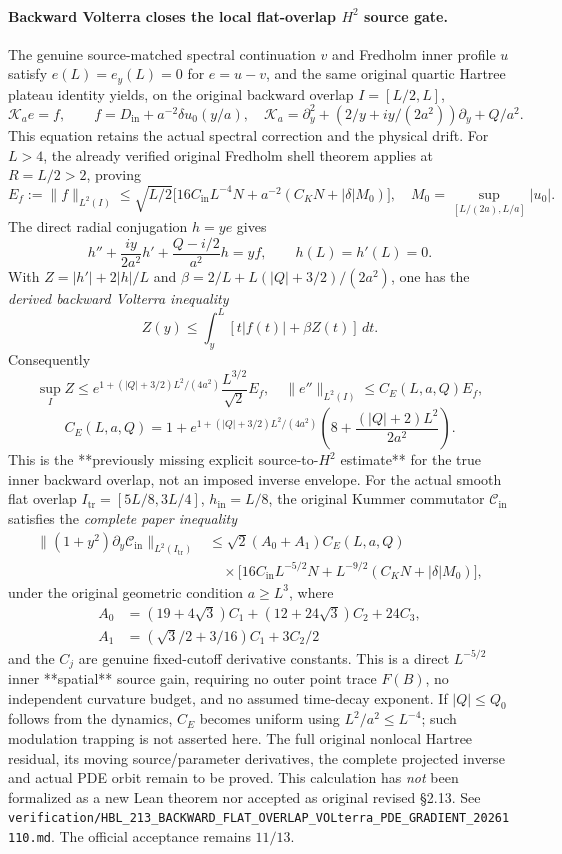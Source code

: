 \documentclass[11pt]{amsart}
\begin{document}
\paragraph{Backward Volterra closes the local flat-overlap \(H^2\) source gate.}
The genuine source-matched spectral continuation \(v\)
and Fredholm inner profile \(u\) satisfy
\(e(L)=e_y(L)=0\) for \(e=u-v\), and the
same original quartic Hartree plateau identity
yields, on the original backward overlap \(I=[L/2,L]\),
\[
 \mathcal K_a e=f,\qquad
 f=D_{\mathrm{in}}+a^{-2}\delta u_0(y/a),
 \quad
 \mathcal K_a=\partial_y^2+
      (2/y+iy/(2a^2))\partial_y+Q/a^2.
\]
This equation retains the actual spectral correction
and the physical drift. For \(L>4\), the already
verified original Fredholm shell theorem applies at
\(R=L/2>2\), proving
\[
 E_f:=\|f\|_{L^2(I)}
 \le\sqrt{L/2}\bigl[
 16C_{\mathrm{in}}L^{-4}N+
 a^{-2}(C_KN+|\delta|M_0)\bigr],\quad
 M_0=\sup_{[L/(2a),L/a]}|u_0|.
\]
The direct radial conjugation \(h=ye\) gives
\[
 h''+\frac{iy}{2a^2}h'
    +\frac{Q-i/2}{a^2}h=yf,\qquad
 h(L)=h'(L)=0.
\]
With \(Z=|h'|+2|h|/L\) and
\(\beta=2/L+L(|Q|+3/2)/(2a^2)\),
one has the \emph{derived backward Volterra inequality}
\[
 Z(y)\le\int_y^L[t|f(t)|+\beta Z(t)]\,dt.
\]
Consequently
\[
 \sup_I Z\le
 e^{1+(|Q|+3/2)L^2/(4a^2)}
 \frac{L^{3/2}}{\sqrt2}E_f,\quad
 \|e''\|_{L^2(I)}\le C_E(L,a,Q)E_f,
\]
\[
 C_E(L,a,Q)=
 1+e^{1+(|Q|+3/2)L^2/(4a^2)}
  \left(8+\frac{(|Q|+2)L^2}{2a^2}\right).
\]
This is the **previously missing explicit
source-to-\(H^2\) estimate** for the true inner
backward overlap, not an imposed inverse envelope.
For the actual smooth flat overlap
\(I_{\mathrm{tr}}=[5L/8,3L/4]\),
\(h_{\mathrm{in}}=L/8\), the original
Kummer commutator \(\mathcal C_{\mathrm{in}}\)
satisfies the \emph{complete paper inequality}
\[
 \boxed{
 \begin{aligned}
 \|(1+y^2)\partial_y\mathcal C_{\mathrm{in}}\|_{L^2(I_{\mathrm{tr}})}
 &\le\sqrt2(A_0+A_1)C_E(L,a,Q)\\
 &\quad\times
 \bigl[16C_{\mathrm{in}}L^{-5/2}N+
 L^{-9/2}(C_KN+|\delta|M_0)\bigr],
 \end{aligned}}
\]
under the original geometric condition \(a\ge L^3\),
where
\[
 \begin{split}
 A_0&=(19+4\sqrt3)C_1+(12+24\sqrt3)C_2+24C_3,\\
 A_1&=(\sqrt3/2+3/16)C_1+3C_2/2
 \end{split}
\]
and the \(C_j\) are genuine fixed-cutoff derivative
constants. This is a direct \(L^{-5/2}\)
inner **spatial** source gain, requiring no outer
point trace \(F(B)\), no independent curvature budget,
and no assumed time-decay exponent. If
\(|Q|\le Q_0\) follows from the dynamics,
\(C_E\) becomes uniform using
\(L^2/a^2\le L^{-4}\);
such modulation trapping is not asserted here.
The full original nonlocal Hartree residual,
its moving source/parameter derivatives,
the complete projected inverse and actual
PDE orbit remain to be proved. This calculation
has \emph{not} been formalized as a new Lean
theorem nor accepted as original revised §2.13.
See
\texttt{verification/HBL\_213\_BACKWARD\_FLAT\_OVERLAP\_VOLterra\_PDE\_GRADIENT\_20261110.md}.
The official acceptance remains \(11/13\).
\end{document}
